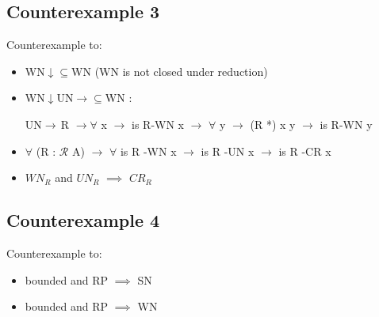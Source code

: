 \documentclass{scrartcl}
\begin{document}
\subsection*{Counterexample 3}
\begin{center}
\end{center}

Counterexample to:
\begin{itemize}
  \item WN$\downarrow\subseteq$WN (WN is not closed under reduction) 
  \item WN$\downarrow$UN$\rightarrow\subseteq$WN :

  UN$\rightarrow\,$R $\to \forall$ x $\to$ is R-WN x $\to$ $\forall$ y $\to$ (R *) x y $\to$ is R-WN y

  \item $\forall$ (R : $\mathscr{R}$ A) $\to$ $\forall$ is R -WN x $\to$ is R -UN x $\to$ is R -CR x
  \item $WN_R$ and $UN_R$ $\implies$ $CR_R$

\end{itemize}

\subsection*{Counterexample 4}

\begin{center}
\end{center}
Counterexample to:
\begin{itemize}
  \item bounded and RP $\implies$ SN
  \item bounded and RP $\implies$ WN
\end{itemize}
\end{document}
